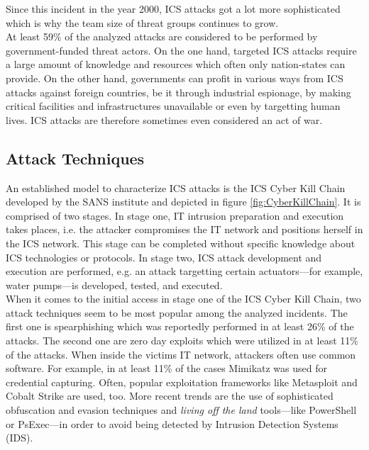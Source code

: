\documentclass[runningheads]{llncs}
\begin{document}
Since this incident in the year 2000, ICS attacks got a lot more sophisticated which is why the team size of threat groups continues to grow.\\
At least 59\% of the analyzed attacks are considered to be performed by government-funded threat actors.
On the one hand, targeted ICS attacks require a large amount of knowledge and resources which often only nation-states can provide.
On the other hand, governments can profit in various ways from ICS attacks against foreign countries, be it through industrial espionage, by making critical facilities and infrastructures unavailable or even by targetting human lives.
ICS attacks are therefore sometimes even considered an act of war. %

\subsection{Attack Techniques}
An established model to characterize ICS attacks is the ICS Cyber Kill Chain developed by the SANS institute and depicted in figure \ref{fig:CyberKillChain}.
It is comprised of two stages.
In stage one, IT intrusion preparation and execution takes places, i.e. the attacker compromises the IT network and positions herself in the ICS network.
This stage can be completed without specific knowledge about ICS technologies or protocols.
In stage two, ICS attack development and execution are performed, e.g. an attack targetting certain actuators---for example, water pumps---is developed, tested, and executed.\\
When it comes to the initial access in stage one of the ICS Cyber Kill Chain, two attack techniques seem to be most popular among the analyzed incidents.
The first one is spearphishing which was reportedly performed in at least 26\% of the attacks.
The second one are zero day exploits which were utilized in at least 11\% of the attacks.
When inside the victims IT network, attackers often use common software.
For example, in at least 11\% of the cases Mimikatz was used for credential capturing.
Often, popular exploitation frameworks like Metasploit and Cobalt Strike are used, too.
More recent trends are the use of sophisticated obfuscation and evasion techniques and \textit{living off the land} tools---like PowerShell or PsExec---in order to avoid being detected by Intrusion Detection Systems (IDS).\\
\end{document}
